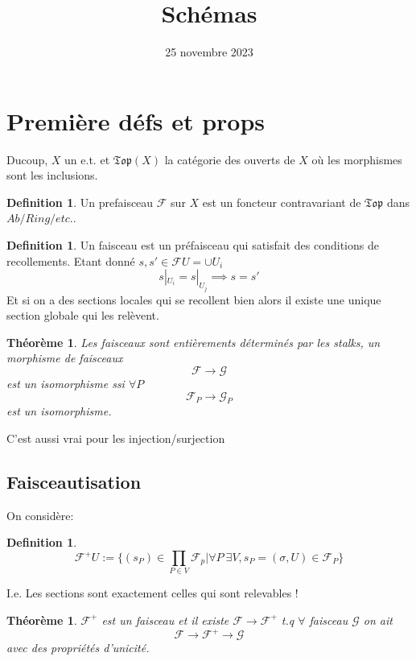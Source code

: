 \documentclass[12pt]{article}
\title{Schémas}
\date{25 novembre 2023}
\newcommand{\F}{\mathcal{F}}
\newcommand{\Topo}{\mathfrak{T}\mathfrak{o}\mathfrak{p}}
\newcommand{\G}{\mathcal{G}}
\theoremstyle{plain}
\newtheorem{thm}[subsubsection]{Th\'eor\`eme}
\theoremstyle{definition}
\newtheorem{defn}[subsubsection]{Definition}
\begin{document}
\tableofcontents
\maketitle


\section{Première défs et props}
Ducoup, $X$ un e.t. et $\Topo(X)$ la catégorie des ouverts de $X$ où les morphismes sont les inclusions.

\begin{defn}
    Un prefaisceau $\F$ sur $X$ est un foncteur contravariant de $\Topo$ dans $Ab/Ring/etc.$.
\end{defn}

\begin{defn}
    Un faisceau est un préfaisceau qui satisfait
    des conditions de recollements. Etant donné $s,s'\in \F U=\cup U_i$
    \[s|_{U_i}=s|_{U_j} \implies s=s'\]
    Et si on a des sections locales qui se recollent bien 
    alors il existe une unique section globale qui les 
    relèvent.
\end{defn}

\begin{thm}
    Les faisceaux sont entièrements déterminés par les stalks, un morphisme de faisceaux 
    \[\F\rightarrow\G\]
    est un isomorphisme ssi $\forall P$ 
    \[\F_P\rightarrow \G_P\]
    est un isomorphisme.
\end{thm}
C'est aussi vrai pour les injection/surjection

\subsection{Faisceautisation}
On considère:
\begin{defn}
    \[\F^+U:=\{(s_P)\in \prod_{P\in V} \F_p | 
    \forall P~ \exists V, s_P = (\sigma, U)\in \F_P \}\]
\end{defn}
I.e. Les sections sont exactement celles qui sont relevables !
\begin{thm}
    $\F^+$ est un faisceau et il existe $\F\rightarrow \F^+$
    t.q $\forall$ faisceau $ \G$ on ait 
    \[ \F\rightarrow \F^+\rightarrow \G \]
    avec des propriétés d'unicité.
\end{thm}
\end{document}
